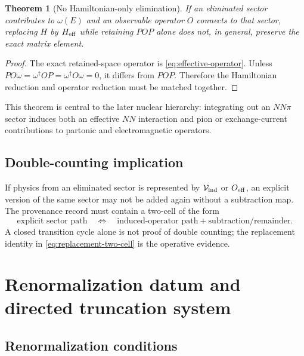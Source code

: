 \documentclass[11pt]{article}
\newtheorem{theorem}[definition]{Theorem}
\newcommand{\cV}{\mathcal V}
\begin{document}
\begin{theorem}[No Hamiltonian-only elimination]
\label{thm:no-hamiltonian-only-elimination}
If an eliminated sector contributes to \(\omega(E)\) and an observable
operator \(O\) connects to that sector, replacing \(H\) by
\(H_{\rm eff}\) while retaining \(POP\) alone does not, in general,
preserve the exact matrix element.
\end{theorem}

\begin{proof}
The exact retained-space operator is
\cref{eq:effective-operator}.  Unless
\(PO\omega=\omega^\dagger OP=\omega^\dagger O\omega=0\), it differs from
\(POP\).  Therefore the Hamiltonian reduction and operator reduction must be
matched together.
\end{proof}

This theorem is central to the later nuclear hierarchy: integrating out an
\(NN\pi\) sector induces both an effective \(NN\) interaction and pion or
exchange-current contributions to partonic and electromagnetic operators.

\subsection{Double-counting implication}

If physics from an eliminated sector is represented by
\(\cV_{\rm ind}\) or \(O_{\rm eff}\), an explicit version of the same
sector may not be added again without a subtraction map.  The provenance
record must contain a two-cell of the form
\begin{equation}
 \text{explicit sector path}
 \quad\Longleftrightarrow\quad
 \text{induced-operator path}+\text{subtraction/remainder}.
\label{eq:replacement-two-cell}
\end{equation}
A closed transition cycle alone is not proof of double counting; the
replacement identity in \cref{eq:replacement-two-cell} is the operative
evidence.

\section{Renormalization datum and directed truncation system}
\label{sec:renormalization}

\subsection{Renormalization conditions}
\end{document}
